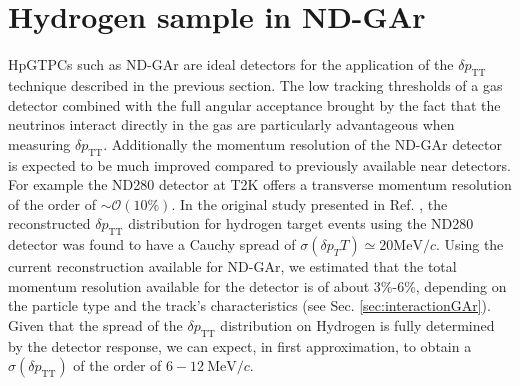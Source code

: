 \section{Hydrogen sample in ND-GAr}
\label{sec:HydrogenNDGAr}
HpGTPCs such as ND-GAr are ideal detectors for the application of the $\delta p_\text{TT}$ technique described in the previous section. The low tracking thresholds of a gas detector combined with the full angular acceptance brought by the fact that the neutrinos interact directly in the gas are particularly advantageous when measuring $\delta p_\text{TT}$. Additionally the momentum resolution of the ND-GAr detector is expected to be much improved compared to previously available near detectors. For example the ND280 detector at T2K offers a transverse momentum resolution of the order of $\sim \mathcal{O}(10\%)$. In the original study presented in Ref. \cite{PhysRevC.94.015503}, the reconstructed $\delta p_\text{TT}$ distribution for hydrogen target events using the ND280 detector was found to have a Cauchy spread of $\sigma(\delta p_TT)\simeq20 \text{MeV}/c$. Using the current reconstruction available for ND-GAr, we estimated that the total momentum resolution available for the detector is of about 3\%-6\%, depending on the particle type and the track's characteristics (see Sec. \ref{sec:interactionGAr}). Given that the spread of the $\delta p_\text{TT}$ distribution on Hydrogen is fully determined by the detector response, we can expect, in first approximation, to obtain a $\sigma(\delta p_\text{TT})$ of the order of $6-12 \ \text{MeV}/c$.

